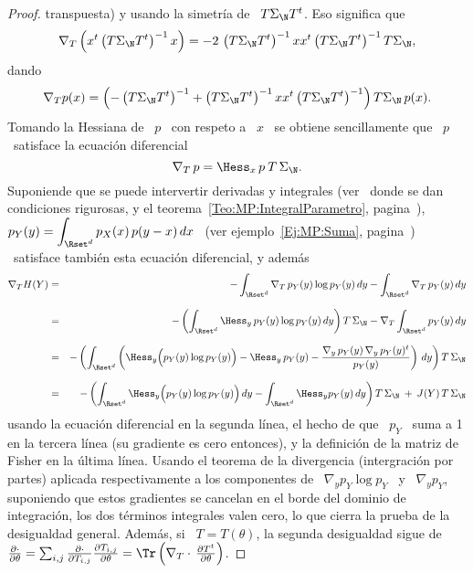 \begin{proof}
  transpuesta) y usando la simetr\'ia de \ $T \Sigma_\N T^t$.  Eso significa
  que
  \[
  \nabla_T \left( x^t \left( T \Sigma_\N T^t \right)^{-1} x \right) = - 2 \,
  \left(  T \Sigma_\N  T^t \right)^{-1}  x  x^t \left(  T \Sigma_\N  T^t
  \right)^{-1} T \Sigma_\N,
  \]
  dando
  \[
  \nabla_T p(x)  = \left( - \left(  T \Sigma_\N T^t \right)^{-1}  + \left( T
      \Sigma_\N  T^t   \right)^{-1}  x   x^t  \left(  T   \Sigma_\N  T^t
    \right)^{-1} \right) T \Sigma_\N \, p(x).
  \]
  Tomando la Hessiana de \ $p$ \  con respeto a \ $x$ \ se obtiene sencillamente
  que \ $p$ \ satisface la ecuaci\'on diferencial
  \[
  \nabla_T \, p = \Hess_x \, p \: T \, \Sigma_\N.
  \]
  Suponiende que  se puede intervertir derivadas  y integrales (ver~\cite{Bar84,
    Bar86}     donde     se      dan     condiciones     rigurosas,     y     el
  teorema~\ref{Teo:MP:IntegralParametro},
  pagina~\pageref{Teo:MP:IntegralParametro}),     $\displaystyle     p_Y(y)     =
  \int_{\Rset^d}  p_X(x)  \,  p(y-x)  \, dx$  \  (ver  ejemplo~\ref{Ej:MP:Suma},
  pagina~\pageref{Ej:MP:Suma})    \   satisface   tambi\'en    esta   ecuaci\'on
  diferencial, y adem\'as
  \begin{eqnarray*}
  \nabla_T H(Y) & = & - \int_{\Rset^d} \nabla_T \, p_Y(y) \log p_Y(y)
  \, dy - \int_{\Rset^d} \nabla_T \, p_Y(y) \, dy\\[2.5mm]
  & = & - \left( \int_{\Rset^d} \Hess_y \, p_Y(y) \log p_Y(y) \, dy \right) T \,
  \Sigma_\N - \nabla_T \int_{\Rset^d} p_Y(y) \, dy\\[2.5mm]
  & = & - \left( \int_{\Rset^d} \left( \Hess_y \Big( p_Y(y) \log p_Y(y) \Big) -
  \Hess_y \, p_Y(y) - \frac{\nabla_y \, p_Y(y) \, \nabla_y \, p_Y(y)^t}{p_Y(y)}
  \right) \, dy \right) T \, \Sigma_\N\\[2.5mm]
  & = & - \left( \int_{\Rset^d} \Hess_y \Big( p_Y(y) \log p_Y(y) \Big) \, dy -
  \int_{\Rset^d} \Hess_y p_Y(y) \, dy \right) T \, \Sigma_\N \: + \: J(Y) \, T
  \, \Sigma_\N
  \end{eqnarray*}
  usando la  ecuaci\'on diferencial  en la  segunda l\'inea, el  hecho de  que \
  $p_Y$ \ suma a  1 en la tercera l\'inea (su gradiente  es cero entonces), y la
  definici\'on de la matriz de Fisher  en la \'ultima l\'inea. Usando el teorema
  de la  divergencia (intergraci\'on por partes) aplicada  respectivamente a los
  componentes de \ $\nabla_y p_Y \log  p_Y$ \ y \ $\nabla_y p_Y$, suponiendo que
  estos gradientes se cancelan en el borde del dominio de integraci\'on, los dos
  t\'erminos integrales  valen cero, lo que  cierra la prueba  de la desigualdad
  general.  Adem\'as,  si \ $T =  T(\theta)$, la segunda desigualdad  sigue de \
  $\frac{\partial   \cdot}{\partial    \theta}   =   \sum_{i,j}   \frac{\partial
    \cdot}{\partial   T_{i,j}}   \frac{\partial   T_{i,j}}{\partial  \theta}   =
  \Tr\left( \nabla_T \cdot \, \frac{\partial T^t}{\partial \theta} \right)$.
\end{proof}

